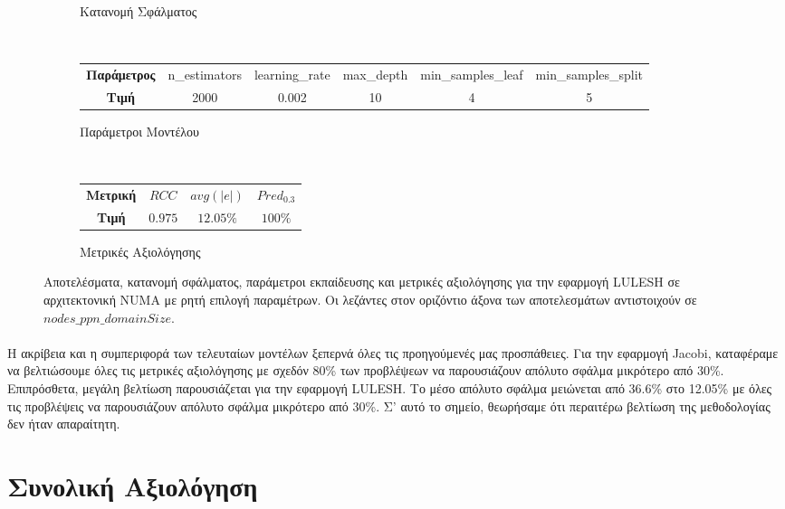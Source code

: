 \begin{figure}[H]
\begin{subfigure}[b]{0.47\textwidth}
        \caption{Κατανομή Σφάλματος}
    \end{subfigure} 
    \\[0.2cm]
    \begin{subfigure}[b]{\textwidth}
   	 	\scriptsize
		\begin{tabular}{c||c|c|c|c|c}
			\textbf{Παράμετρος} & n\_estimators & learning\_rate & max\_depth & min\_samples\_leaf & min\_samples\_split \\
			\textbf{Τιμή}       &       2000        &  0.002               & 10          &  4                  &    5
		\end{tabular}
		\caption{Παράμετροι Μοντέλου}
    \end{subfigure}
    \\[0.2cm]
    \begin{subfigure}[b]{\textwidth}
    		\centering
   	 	\scriptsize
		\begin{tabular}{c||c|c|c}
			\textbf{Μετρική} & $RCC$ &   $avg(|e|)$ & $Pred_{0.3}$  \\
			\textbf{Τιμή}  &  $0.975$   &      $12.05\%
			$        &  $100\%$                                         
		\end{tabular}
		\caption{Μετρικές Αξιολόγησης}
    \end{subfigure}
    
        \caption{Αποτελέσματα, κατανομή σφάλματος, παράμετροι εκπαίδευσης και μετρικές αξιολόγησης για την εφαρμογή LULESH σε αρχιτεκτονική NUMA με ρητή επιλογή παραμέτρων. Οι λεζάντες στον οριζόντιο άξονα των αποτελεσμάτων αντιστοιχούν σε $nodes\_ppn\_domainSize$.}
    \label{fig:NB_cg_mfs_lulesh_NUMA}
\end{figure}

\paragraph{}
Η ακρίβεια και η συμπεριφορά των τελευταίων μοντέλων ξεπερνά όλες τις προηγούμενές μας προσπάθειες. Για την εφαρμογή Jacobi, καταφέραμε να βελτιώσουμε όλες τις μετρικές αξιολόγησης με σχεδόν 80\% των προβλέψεων να παρουσιάζουν απόλυτο σφάλμα μικρότερο από 30\%. Επιπρόσθετα, μεγάλη βελτίωση παρουσιάζεται για την εφαρμογή LULESH. Το μέσο απόλυτο σφάλμα μειώνεται από 36.6\% στο 12.05\% με όλες τις προβλέψεις να παρουσιάζουν απόλυτο σφάλμα μικρότερο από 30\%. Σ' αυτό το σημείο, θεωρήσαμε ότι περαιτέρω βελτίωση της μεθοδολογίας δεν ήταν απαραίτητη.

\section{Συνολική Αξιολόγηση}
